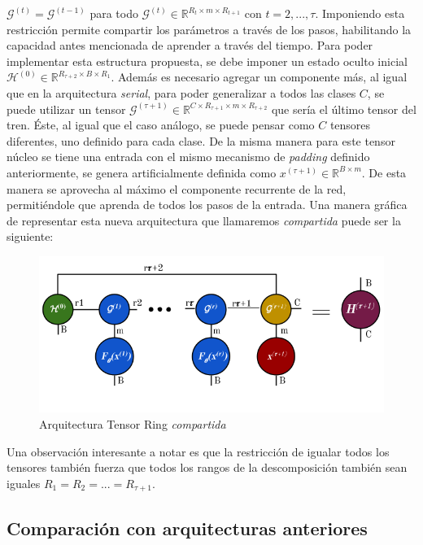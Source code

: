 \documentclass[spanish]{article}
\theoremstyle{definition}
\theoremstyle{remark}
\numberwithin{equation}{section}
\numberwithin{equation}{section} %
\begin{document}
$\mathcal{G}^{(t)}=\mathcal{G}^{(t-1)}$ para todo $\mathcal{G}^{(t)} \in \mathbb{R}^{R_t \times m \times R_{t+1}}$ con $t=2,...,\tau$. Imponiendo esta restricción permite compartir los parámetros a través de los pasos, habilitando la capacidad antes mencionada de aprender a través del tiempo. Para poder implementar esta estructura propuesta, se debe imponer un estado oculto inicial $\mathcal{H}^{(0)} \in \mathbb{R}^{R_{\tau+2}\times B \times R_1}$. Además es necesario agregar un componente más, al igual que en la arquitectura \textit{serial}, para poder generalizar a todos las clases $C$, se puede utilizar un tensor  $\mathcal{G}^{(\tau+1)} \in \mathbb{R}^{C \times R_{\tau+1} \times m \times R_{\tau+2}}$ que sería el último tensor del tren. Éste, al igual que el caso análogo, se puede pensar como $C$ tensores diferentes, uno definido para cada clase. De la misma manera para este tensor núcleo se tiene una entrada con el mismo mecanismo de \textit{padding} definido anteriormente, se genera artificialmente definida como $x^{(\tau+1)} \in \mathbb{R}^{B \times m}$. De esta manera se aprovecha al máximo el componente recurrente de la red, permitiéndole que aprenda de todos los pasos de la entrada. Una manera gráfica de representar esta nueva arquitectura que llamaremos \textit{compartida} puede ser la siguiente:   
\begin{figure}[H]
 \centering
 \includegraphics[width=12cm]{img/ejemplo_arquitectura_compartida.png} \caption[Arquitectura Tensor Ring \textit{compartida}]{\footnotesize{Arquitectura Tensor Ring \textit{compartida}}}
\label{fig:arquitecture_shared}
\end{figure}\par  
Una observación interesante a notar es que la restricción de igualar todos los tensores también fuerza que todos los rangos de la descomposición también sean iguales $R_1=R_2=...=R_{\tau+1}$. 


\subsection{Comparación con arquitecturas anteriores}
\end{document}
